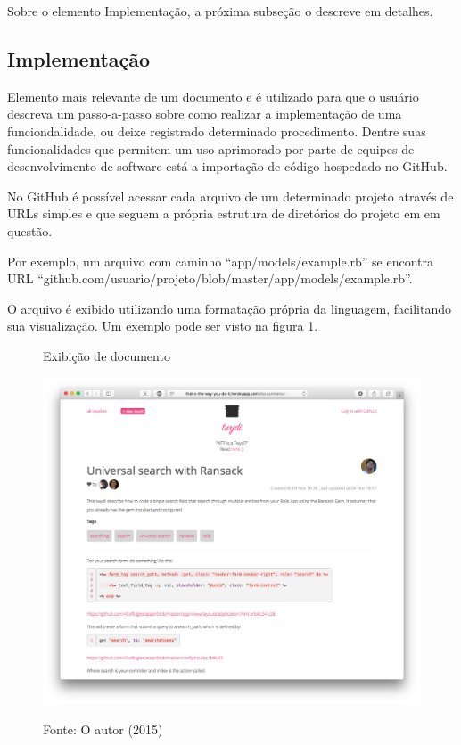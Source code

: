 Sobre o elemento Implementação, a próxima subseção o descreve em detalhes.

\subsection{Implementação}

Elemento mais relevante de um documento e é utilizado para que o usuário descreva um passo-a-passo sobre como realizar a implementação de uma funciondalidade, ou deixe registrado determinado procedimento. Dentre suas funcionalidades que permitem um uso aprimorado por parte de equipes de desenvolvimento de software está a importação de código hospedado no GitHub.

No GitHub é possível acessar cada arquivo de um determinado projeto através de URLs simples e que seguem a própria estrutura de diretórios do projeto em em questão.

Por exemplo, um arquivo com caminho ``app/models/example.rb'' se encontra URL ``github.com/usuario/projeto/blob/master/app/models/example.rb''.

O arquivo é exibido utilizando uma formatação própria da linguagem, facilitando sua visualização. Um exemplo pode ser visto na figura \ref{fig:doc-show-show}.

\begin{figure}[h!]
	\centering
    \caption{Exibição de documento}
    \includegraphics[width=15cm]{Imagens/print-implementation-1.png}
		\label{fig:doc-show-show}
	\caption*{Fonte: O autor (2015)}
\end{figure}

